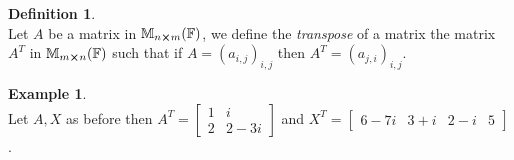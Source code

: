 \documentclass[12pt]{article}
\theoremstyle{definition}
\newtheorem{definition}[theorem]{Definition}
\newtheorem*{example}{Example}
\theoremstyle{remark}
\theoremstyle{plain}
\begin{document}
\begin{definition}\leavevmode \\
	Let $A$ be a matrix in $\mathbb{M}_{n\cross m}(\mathbb{F})$, we define the \textit{transpose} of a matrix the matrix $A^T$ in $\mathbb{M}_{m\cross n}(\mathbb{F})$ such that if $A=(a_{i,j})_{i,j}$ then $A^T=(a_{j,i})_{i,j}$.
\end{definition}

\begin{example}\leavevmode \\
    Let $A,X$ as before then $A^T=\begin{bmatrix}
        1 & i \\
        2 & 2-3i
    \end{bmatrix}$ and $X^T=\begin{bmatrix}
        6-7i & 3+i & 2-i & 5
    \end{bmatrix}$.
\end{example}
\end{document}
